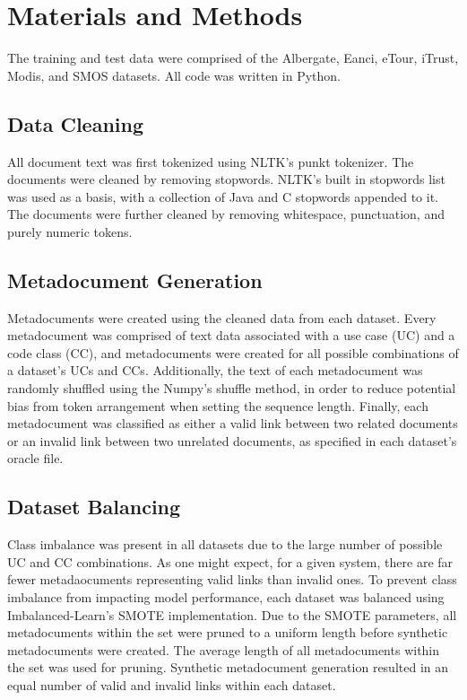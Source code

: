 \documentclass{article}
\begin{document}
\section{Materials and Methods}
    The training and test data were comprised of the Albergate, Eanci, eTour, iTrust, Modis, and SMOS datasets. All code was written in Python. 
    
\subsection{Data Cleaning}
    All document text was first tokenized using NLTK's\citep{BirdKleinLoper09} punkt tokenizer. The documents were cleaned by removing stopwords. NLTK's built in stopwords list was used as a basis, with a collection of Java and C stopwords appended to it. The documents were further cleaned by removing whitespace, punctuation, and purely numeric tokens. 

\subsection{Metadocument Generation}
    Metadocuments were created using the cleaned data from each dataset. Every metadocument was comprised of text data associated with a use case (UC) and a code class (CC), and metadocuments were created for all possible combinations of a dataset's UCs and CCs. Additionally, the text of each metadocument was randomly shuffled using the Numpy's\citep{harris2020array} shuffle method, in order to reduce potential bias from token arrangement when setting the sequence length. Finally, each metadocument was classified as either a valid link between two related documents or an invalid link between two unrelated documents, as specified in each dataset's oracle file.

\subsection{Dataset Balancing}
    Class imbalance was present in all datasets due to the large number of possible UC and CC combinations. As one might expect, for a given system, there are far fewer metadaocuments representing valid links than invalid ones. To prevent class imbalance from impacting model performance, each dataset was balanced using Imbalanced-Learn's\citep{JMLR:v18:16-365} SMOTE implementation. Due to the SMOTE parameters, all metadocuments within the set were pruned to a uniform length before synthetic metadocuments were created. The average length of all metadocuments within the set was used for pruning. Synthetic metadocument generation resulted in an equal number of valid and invalid links within each dataset.
\end{document}
